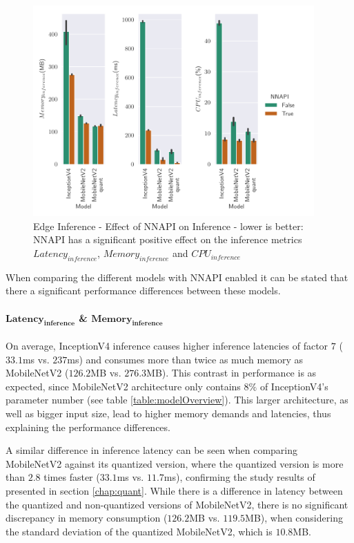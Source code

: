 \begin{figure}[!htb]
\centering
\includegraphics[width=0.96\textwidth]{./Bilder/single_plots/edge_inference_plots/NNAPI_behavior.pdf}
\caption[Edge Inference - Effect of NNAPI on Inference]{Edge Inference - Effect of NNAPI on Inference - lower is better: NNAPI has a significant positive effect on the inference metrics $Latency_{inference}$, $Memory_{inference}$ and $CPU_{inference}$}
\label{fig:NNAPI}
\end{figure}

When comparing the different models with NNAPI enabled it can be stated that there a significant performance differences between these models.
\paragraph{$\mathbf{Latency_{inference}}$ \& $\mathbf{Memory_{inference}}$}
On average, InceptionV4 inference causes higher inference latencies of factor $7$ ($33.1$ms vs. $237$ms) and consumes more than twice as much memory as MobileNetV2 ($126.2$MB vs. $276.3$MB).
This contrast in performance is as expected, since MobileNetV2 architecture only contains $8\%$ of InceptionV4's parameter number (see table \ref{table:modelOverview}).
This larger architecture, as well as bigger input size, lead to higher memory demands and latencies, thus explaining the performance differences.

A similar difference in inference latency can be seen when comparing MobileNetV2 against its quantized version, where the quantized version is more than $2.8$ times faster ($33.1$ms vs. $11.7$ms), confirming the study results of \cite{Quantizing} presented in section \ref{chap:quant}.
While there is a difference in latency between the quantized and non-quantized versions of MobileNetV2, there is no significant discrepancy in memory consumption ($126.2$MB vs. $119.5$MB), when considering the standard deviation of the quantized MobileNetV2, which is $10.8$MB.


